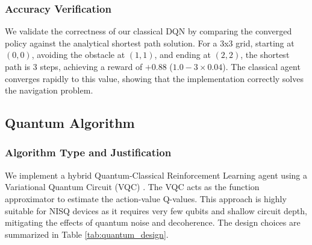 \documentclass[12pt, a4paper]{article}
\begin{document}

\subsubsection{Accuracy Verification}

We validate the correctness of our classical DQN by comparing the converged policy against the analytical shortest path solution. For a 3x3 grid, starting at $(0, 0)$, avoiding the obstacle at $(1, 1)$, and ending at $(2, 2)$, the shortest path is 3 steps, achieving a reward of $+0.88$ ($1.0 - 3 \times 0.04$). The classical agent converges rapidly to this value, showing that the implementation correctly solves the navigation problem.

\subsection{Quantum Algorithm}

\subsubsection{Algorithm Type and Justification}

We implement a hybrid Quantum-Classical Reinforcement Learning agent using a Variational Quantum Circuit (VQC) \cite{chen2020}. The VQC acts as the function approximator to estimate the action-value Q-values. This approach is highly suitable for NISQ devices as it requires very few qubits and shallow circuit depth, mitigating the effects of quantum noise and decoherence. The design choices are summarized in Table \ref{tab:quantum_design}.
\end{document}
